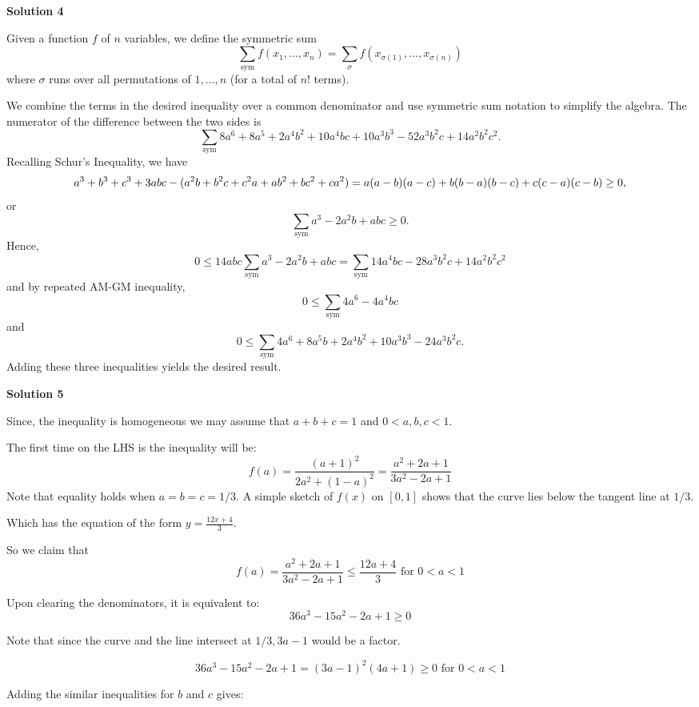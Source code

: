 \begin{enumerate}
 



\textbf{Solution 4}

Given a function $f$ of $n$ variables, we define the symmetric sum
 \[\sum_{\text{sym}}f(x_1, \ldots, x_n) = \sum_{\sigma} f(x_{\sigma(1)}, \ldots, x_{\sigma(n)})\]where $\sigma$ runs over all permutations of $1, \ldots, n$ (for a total of $n!$ terms).

 We combine the terms in the desired inequality over a common denominator and use symmetric sum notation to simplify the algebra. The numerator of the difference between the two sides is
 \[\sum_{\text{sym}} 8a^6 + 8a^5 + 2a^4b^2 + 10a^4bc + 10a^3b^3 - 52a^3b^2c + 14a^2b^2c^2.\]Recalling Schur's Inequality, we have
 \[a^3 + b^3 + c^3 + 3abc - (a^2b + b^2c + c^2a + ab^2 + bc^2 + ca^2) \\ = a(a - b)(a - c) + b(b - a)(b - c) + c(c - a)(c - b)\geq 0,\]or
 \[\sum_{\text{sym}} a^3 - 2a^2b + abc\geq 0.\]Hence,
 \[0\leq 14abc\sum_{\text{sym}} a^3 - 2a^2b + abc = \sum_{\text{sym}} 14a^4bc - 28a^3b^2c + 14a^2b^2c^2\]and by repeated AM-GM inequality,
 \[0\leq\sum_{\text{sym}} 4a^6 - 4a^4bc\]and
 \[0\leq\sum_{\text{sym}} 4a^6 + 8a^5b + 2a^4b^2 + 10a^3b^3 - 24a^3b^2c.\]Adding these three inequalities yields the desired result.

 



\textbf{Solution 5}

Since, the inequality is homogeneous we may assume that $a+b+c=1$ and $0<a,b, c<1$.

 The first time on the LHS is the inequality will be: 
 \[f(a)=\frac{(a+1)^2}{2a^2+(1-a)^2}=\frac{a^2+2a+1}{3a^2-2a+1}\]Note that equality holds when $a=b=c=1/3$. A simple sketch of $f(x)$ on $[0,1]$ shows that the curve lies below the tangent line at $1/3$.

 Which has the equation of the form $y=\frac{12x+4}{3}$.

 So we claim that 
 \[f(a) = \frac{a^2+2a+1}{3a^2-2a+1} \leq \frac{12a+4}{3} \text{ for } 0 <a <1\]

 Upon clearing the denominators, it is equivalent to: 
 \[36a^3-15a^2-2a+1 \geq 0\]

 Note that since the curve and the line intersect at $1/3, 3a-1$ would be a factor. 

 
 \[36a^3-15a^2-2a+1 = (3a-1)^2(4a+1) \geq 0 \text{ for } 0<a<1\]

 Adding the similar inequalities for $b$ and $c$ gives: 


\end{enumerate}
